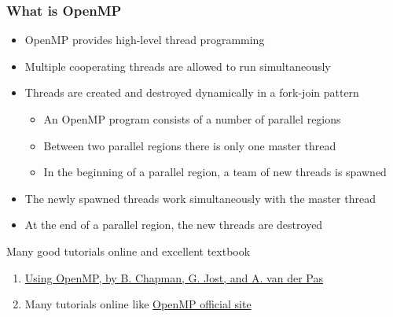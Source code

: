 \documentclass{beamer}
\begin{document}
\begin{frame}
\frametitle{What is OpenMP}

\begin{block}{}
\begin{itemize}
\item OpenMP provides high-level thread programming

\item Multiple cooperating threads are allowed to run simultaneously

\item Threads are created and destroyed dynamically in a fork-join pattern
\begin{itemize}

   \item An OpenMP program consists of a number of parallel regions

   \item Between two parallel regions there is only one master thread

   \item In the beginning of a parallel region, a team of new threads is spawned

\end{itemize}

\noindent
  \item The newly spawned threads work simultaneously with the master thread

  \item At the end of a parallel region, the new threads are destroyed
\end{itemize}

\noindent
Many good tutorials online and excellent textbook
\begin{enumerate}
\item \href{{http://mitpress.mit.edu/books/using-openmp}}{Using OpenMP, by B. Chapman, G. Jost, and A. van der Pas}

\item Many tutorials online like \href{{http://www.openmp.org}}{OpenMP official site}
\end{enumerate}

\noindent
\end{block}
\end{frame}
\end{document}
